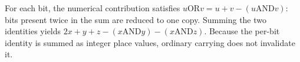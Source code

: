 For each bit, the numerical contribution satisfies $ u\mathbin{\mathrm{OR}}v=u+v-(u\mathbin{\mathrm{AND}}v)$: bits present twice in the sum are reduced to one copy. Summing the two identities yields $\boxed{2x+y+z-(x\mathbin{\mathrm{AND}}y)-(x\mathbin{\mathrm{AND}}z)}$. Because the per-bit identity is summed as integer place values, ordinary carrying does not invalidate it.
